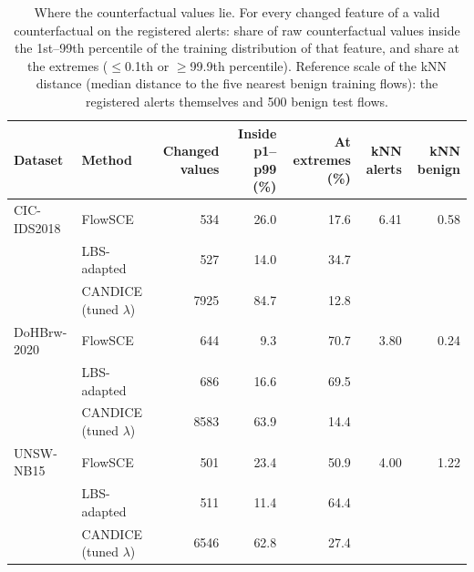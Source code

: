 \begin{table}[t]
\centering\footnotesize
\caption{Where the counterfactual values lie. For every changed feature of a valid counterfactual on the registered alerts: share of raw counterfactual values inside the 1st--99th percentile of the training distribution of that feature, and share at the extremes ($\le$0.1th or $\ge$99.9th percentile). Reference scale of the kNN distance (median distance to the five nearest benign training flows): the registered alerts themselves and 500 benign test flows.}
\label{tab:a-plausibility}
\begin{tabular}{@{}llrrrrr@{}}
\toprule
Dataset & Method & Changed values & Inside p1--p99 (\%) & At extremes (\%) & kNN alerts & kNN benign \\
\midrule
CIC-IDS2018 & FlowSCE & 534 & 26.0 & 17.6 & 6.41 & 0.58 \\
 & LBS-adapted & 527 & 14.0 & 34.7 &  &  \\
 & CANDICE (tuned $\lambda$) & 7925 & 84.7 & 12.8 &  &  \\
\midrule
DoHBrw-2020 & FlowSCE & 644 & 9.3 & 70.7 & 3.80 & 0.24 \\
 & LBS-adapted & 686 & 16.6 & 69.5 &  &  \\
 & CANDICE (tuned $\lambda$) & 8583 & 63.9 & 14.4 &  &  \\
\midrule
UNSW-NB15 & FlowSCE & 501 & 23.4 & 50.9 & 4.00 & 1.22 \\
 & LBS-adapted & 511 & 11.4 & 64.4 &  &  \\
 & CANDICE (tuned $\lambda$) & 6546 & 62.8 & 27.4 &  &  \\
\bottomrule
\end{tabular}
\end{table}
